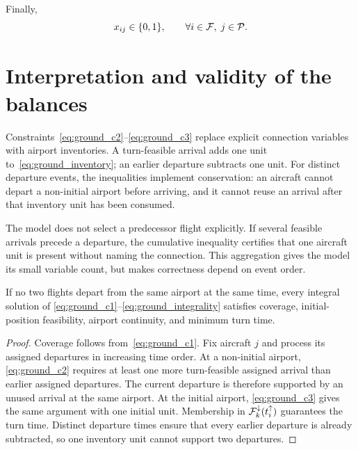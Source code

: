 Finally,
\begin{equation}
    x_{ij}\in\{0,1\},
    \qquad\forall i\in\mathcal{F},\;j\in\mathcal{P}.
    \label{eq:ground_integrality}
\end{equation}

\section{Interpretation and validity of the balances}

Constraints~\eqref{eq:ground_c2}--\eqref{eq:ground_c3} replace explicit
connection variables with airport inventories. A turn-feasible arrival adds one
unit to~\eqref{eq:ground_inventory}; an earlier departure subtracts one unit.
For distinct departure events, the inequalities implement conservation: an
aircraft cannot depart a non-initial airport before arriving, and it cannot
reuse an arrival after that inventory unit has been consumed.

The model does not select a predecessor flight explicitly. If several feasible
arrivals precede a departure, the cumulative inequality certifies that one
aircraft unit is present without naming the connection. This aggregation gives
the model its small variable count, but makes correctness depend on event order.

\begin{proposition}
    \label{prop:ground_distinct_validity}
    If no two flights depart from the same airport at the same time, every
    integral solution of
    \eqref{eq:ground_c1}--\eqref{eq:ground_integrality} satisfies coverage,
    initial-position feasibility, airport continuity, and minimum turn time.
\end{proposition}

\begin{proof}
    Coverage follows from~\eqref{eq:ground_c1}. Fix aircraft $j$ and process its
    assigned departures in increasing time order. At a non-initial airport,
    \eqref{eq:ground_c2} requires at least one more turn-feasible assigned arrival
    than earlier assigned departures. The current departure is therefore
    supported by an unused arrival at the same airport. At the initial airport,
    \eqref{eq:ground_c3} gives the same argument with one initial unit. Membership
    in $\mathcal{F}_k^{\downarrow}(t_i^{\uparrow})$ guarantees the turn time. Distinct
    departure times ensure that every earlier departure is already subtracted, so
    one inventory unit cannot support two departures.
\end{proof}

